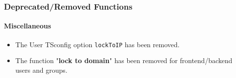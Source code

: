 %

\begin{frame}[fragile]
	\frametitle{Deprecated/Removed Functions}
	\framesubtitle{Miscellaneous}

	\begin{itemize}
		\item The User TSconfig option \texttt{lockToIP} has been removed.
		\item The function "\textbf{lock to domain}" has been removed for frontend/backend
			users and groups.
	\end{itemize}

\end{frame}

